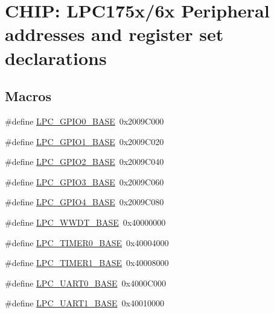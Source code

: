 \hypertarget{group__PERIPH__175X__6X__BASE}{\section{C\-H\-I\-P\-: L\-P\-C175x/6x Peripheral addresses and register set declarations}
\label{group__PERIPH__175X__6X__BASE}
}
\subsection*{Macros}
\begin{DoxyCompactItemize}
\item 
\#define \hyperlink{group__PERIPH__175X__6X__BASE_ga09e0e964ea1abf3b991772df2aa52405}{L\-P\-C\-\_\-\-G\-P\-I\-O0\-\_\-\-B\-A\-S\-E}~0x2009\-C000
\item 
\#define \hyperlink{group__PERIPH__175X__6X__BASE_ga9fb0536853721a3073bd69d94d0b7ec2}{L\-P\-C\-\_\-\-G\-P\-I\-O1\-\_\-\-B\-A\-S\-E}~0x2009\-C020
\item 
\#define \hyperlink{group__PERIPH__175X__6X__BASE_gae5524b2d728167194033ec7a1841a36b}{L\-P\-C\-\_\-\-G\-P\-I\-O2\-\_\-\-B\-A\-S\-E}~0x2009\-C040
\item 
\#define \hyperlink{group__PERIPH__175X__6X__BASE_ga56c68c5326b521b3278a35f4d81369a9}{L\-P\-C\-\_\-\-G\-P\-I\-O3\-\_\-\-B\-A\-S\-E}~0x2009\-C060
\item 
\#define \hyperlink{group__PERIPH__175X__6X__BASE_gaa54352e7745932e78b56bcbc1d70fa21}{L\-P\-C\-\_\-\-G\-P\-I\-O4\-\_\-\-B\-A\-S\-E}~0x2009\-C080
\item 
\#define \hyperlink{group__PERIPH__175X__6X__BASE_ga9b83c39ba53f9c9e87974984c96e35de}{L\-P\-C\-\_\-\-W\-W\-D\-T\-\_\-\-B\-A\-S\-E}~0x40000000
\item 
\#define \hyperlink{group__PERIPH__175X__6X__BASE_ga58d2cc2a6a4bd9319853ad5b62a20d43}{L\-P\-C\-\_\-\-T\-I\-M\-E\-R0\-\_\-\-B\-A\-S\-E}~0x40004000
\item 
\#define \hyperlink{group__PERIPH__175X__6X__BASE_ga077e94a95d95d79f6aeb0ea962377c46}{L\-P\-C\-\_\-\-T\-I\-M\-E\-R1\-\_\-\-B\-A\-S\-E}~0x40008000
\item 
\#define \hyperlink{group__PERIPH__175X__6X__BASE_gaa96fb70405a1298b350fc6f0ad0af997}{L\-P\-C\-\_\-\-U\-A\-R\-T0\-\_\-\-B\-A\-S\-E}~0x4000\-C000
\item 
\#define \hyperlink{group__PERIPH__175X__6X__BASE_ga18e8f96b25e3f343bdd7ba552ae7a617}{L\-P\-C\-\_\-\-U\-A\-R\-T1\-\_\-\-B\-A\-S\-E}~0x40010000

\end{DoxyCompactItemize}
